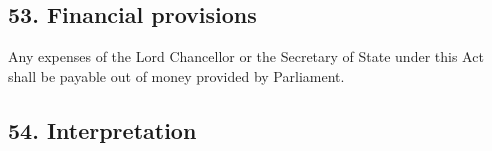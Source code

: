 \documentclass[12pt,a4paper]{article}
\begin{document}

\subsection{53. Financial provisions}

Any expenses of the Lord Chancellor or the Secretary of State under this Act shall be payable out of money provided by Parliament.


\subsection{54. Interpretation}
\end{document}
